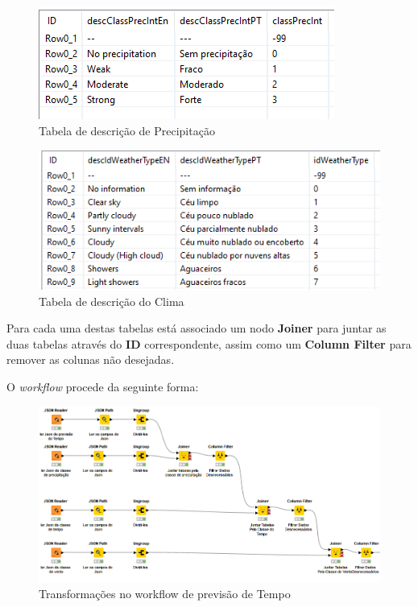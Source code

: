 \begin{figure}[H]
    \centering
    \includegraphics[]{imagens/PrecType.png}
    \caption{Tabela de descrição de Precipitação}
\end{figure}

\begin{figure}[H]
    \centering
    \includegraphics[]{imagens/WeatherType.png}
    \caption{Tabela de descrição do Clima}
\end{figure}

\newpage

Para cada uma destas tabelas está associado um nodo \textbf{Joiner} para juntar as duas tabelas através do \textbf{ID} correspondente, assim como um \textbf{Column Filter} para remover as colunas não desejadas.

O \textit{workflow} procede da seguinte forma:

\begin{figure}[H]
    \centering
    \includegraphics[scale=0.5]{imagens/prevWorkflowTrans.png}
    \caption{Transformações no workflow de previsão de Tempo}
\end{figure}

